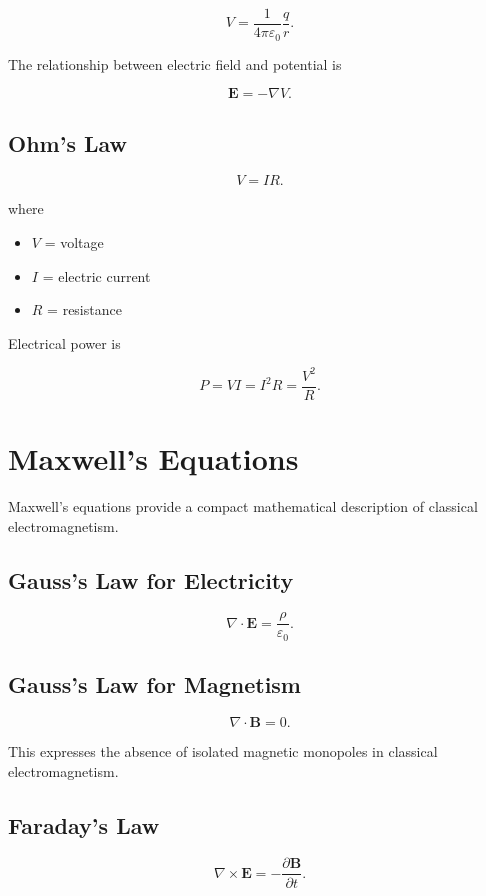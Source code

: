 \documentclass[11pt,a4paper]{article}
\begin{document}
\[
V=
\frac{1}{4\pi\varepsilon_0}
\frac{q}{r}.
\]

The relationship between electric field and potential is

\[
\bm{E}=-\nabla V.
\]

\subsection{Ohm's Law}

\[
V=IR.
\]

where

\begin{itemize}
    \item $V$ = voltage
    \item $I$ = electric current
    \item $R$ = resistance
\end{itemize}

Electrical power is

\[
P=VI=I^2R=\frac{V^2}{R}.
\]

\section{Maxwell's Equations}

Maxwell's equations provide a compact mathematical description of classical electromagnetism.

\subsection{Gauss's Law for Electricity}

\[
\nabla\cdot\bm{E}
=
\frac{\rho}{\varepsilon_0}.
\]

\subsection{Gauss's Law for Magnetism}

\[
\nabla\cdot\bm{B}=0.
\]

This expresses the absence of isolated magnetic monopoles in classical electromagnetism.

\subsection{Faraday's Law}

\[
\nabla\times\bm{E}
=
-\frac{\partial\bm{B}}{\partial t}.
\]
\end{document}

